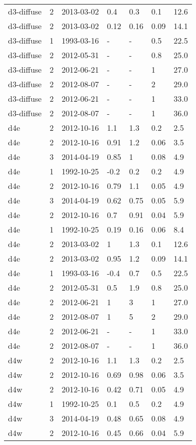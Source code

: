 \begin{table*}[htp]
\begin{tabular}{llll}
d3-diffuse & 2 & 2013-03-02 & 0.4 & 0.3 & 0.1 & 12.6 \\
d3-diffuse & 2 & 2013-03-02 & 0.12 & 0.16 & 0.09 & 14.1 \\
d3-diffuse & 1 & 1993-03-16 & - & - & 0.5 & 22.5 \\
d3-diffuse & 2 & 2012-05-31 & - & - & 0.8 & 25.0 \\
d3-diffuse & 2 & 2012-06-21 & - & - & 1 & 27.0 \\
d3-diffuse & 2 & 2012-08-07 & - & - & 2 & 29.0 \\
d3-diffuse & 2 & 2012-06-21 & - & - & 1 & 33.0 \\
d3-diffuse & 2 & 2012-08-07 & - & - & 1 & 36.0 \\
d4e & 2 & 2012-10-16 & 1.1 & 1.3 & 0.2 & 2.5 \\
d4e & 2 & 2012-10-16 & 0.91 & 1.2 & 0.06 & 3.5 \\
d4e & 3 & 2014-04-19 & 0.85 & 1 & 0.08 & 4.9 \\
d4e & 1 & 1992-10-25 & -0.2 & 0.2 & 0.2 & 4.9 \\
d4e & 2 & 2012-10-16 & 0.79 & 1.1 & 0.05 & 4.9 \\
d4e & 3 & 2014-04-19 & 0.62 & 0.75 & 0.05 & 5.9 \\
d4e & 2 & 2012-10-16 & 0.7 & 0.91 & 0.04 & 5.9 \\
d4e & 1 & 1992-10-25 & 0.19 & 0.16 & 0.06 & 8.4 \\
d4e & 2 & 2013-03-02 & 1 & 1.3 & 0.1 & 12.6 \\
d4e & 2 & 2013-03-02 & 0.95 & 1.2 & 0.09 & 14.1 \\
d4e & 1 & 1993-03-16 & -0.4 & 0.7 & 0.5 & 22.5 \\
d4e & 2 & 2012-05-31 & 0.5 & 1.9 & 0.8 & 25.0 \\
d4e & 2 & 2012-06-21 & 1 & 3 & 1 & 27.0 \\
d4e & 2 & 2012-08-07 & 1 & 5 & 2 & 29.0 \\
d4e & 2 & 2012-06-21 & - & - & 1 & 33.0 \\
d4e & 2 & 2012-08-07 & - & - & 1 & 36.0 \\
d4w & 2 & 2012-10-16 & 1.1 & 1.3 & 0.2 & 2.5 \\
d4w & 2 & 2012-10-16 & 0.69 & 0.98 & 0.06 & 3.5 \\
d4w & 2 & 2012-10-16 & 0.42 & 0.71 & 0.05 & 4.9 \\
d4w & 1 & 1992-10-25 & 0.1 & 0.5 & 0.2 & 4.9 \\
d4w & 3 & 2014-04-19 & 0.48 & 0.65 & 0.08 & 4.9 \\
d4w & 2 & 2012-10-16 & 0.45 & 0.66 & 0.04 & 5.9 \\

\end{tabular}
\end{table*}
